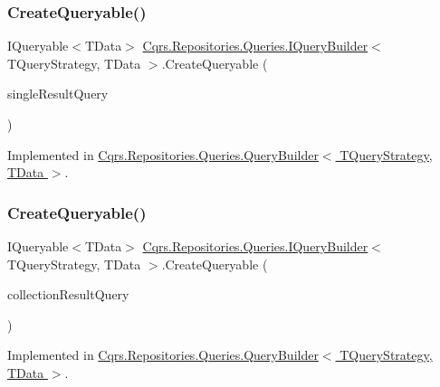 \subsubsection{\texorpdfstring{Create\+Queryable()}{CreateQueryable()}\hspace{0.1cm}{\footnotesize\ttfamily [1/2]}}
{\footnotesize\ttfamily I\+Queryable$<$T\+Data$>$ \hyperlink{interfaceCqrs_1_1Repositories_1_1Queries_1_1IQueryBuilder}{Cqrs.\+Repositories.\+Queries.\+I\+Query\+Builder}$<$ T\+Query\+Strategy, T\+Data $>$.Create\+Queryable (\begin{DoxyParamCaption}\item[{\hyperlink{interfaceCqrs_1_1Repositories_1_1Queries_1_1ISingleResultQuery}{I\+Single\+Result\+Query}$<$ T\+Query\+Strategy, T\+Data $>$}]{single\+Result\+Query }\end{DoxyParamCaption})}



Implemented in \hyperlink{classCqrs_1_1Repositories_1_1Queries_1_1QueryBuilder_a6b103726f538e81ca0489a51b1aa3c88}{Cqrs.\+Repositories.\+Queries.\+Query\+Builder$<$ T\+Query\+Strategy, T\+Data $>$}.

\mbox{\label{interfaceCqrs_1_1Repositories_1_1Queries_1_1IQueryBuilder_ab903955b6fb1843a3e168b33252161a5}} 
\subsubsection{\texorpdfstring{Create\+Queryable()}{CreateQueryable()}\hspace{0.1cm}{\footnotesize\ttfamily [2/2]}}
{\footnotesize\ttfamily I\+Queryable$<$T\+Data$>$ \hyperlink{interfaceCqrs_1_1Repositories_1_1Queries_1_1IQueryBuilder}{Cqrs.\+Repositories.\+Queries.\+I\+Query\+Builder}$<$ T\+Query\+Strategy, T\+Data $>$.Create\+Queryable (\begin{DoxyParamCaption}\item[{\hyperlink{interfaceCqrs_1_1Repositories_1_1Queries_1_1ICollectionResultQuery}{I\+Collection\+Result\+Query}$<$ T\+Query\+Strategy, T\+Data $>$}]{collection\+Result\+Query }\end{DoxyParamCaption})}



Implemented in \hyperlink{classCqrs_1_1Repositories_1_1Queries_1_1QueryBuilder_af8860edf3677cb80ae481f17ff2db9b5}{Cqrs.\+Repositories.\+Queries.\+Query\+Builder$<$ T\+Query\+Strategy, T\+Data $>$}.

